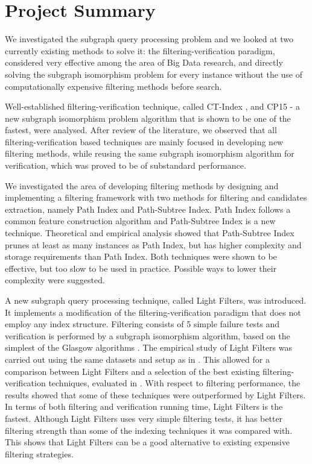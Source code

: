 \documentclass{l4proj}
\begin{document}
\section{Project Summary}
We investigated the subgraph query processing problem and we looked at two currently existing methods to solve it: the filtering-verification paradigm, considered very effective among the area of Big Data research, and directly solving the subgraph isomorphism problem for every instance without the use of computationally expensive filtering methods before search.

Well-established filtering-verification technique, called CT-Index \cite{ctindex}, and CP15 \cite{CP2015}- a new subgraph isomorphism problem algorithm that is shown to be one of the fastest, were analysed. After review of the literature, we observed that all filtering-verification based techniques are mainly focused in developing new filtering methods, while reusing the same subgraph isomorphism algorithm for verification, which was proved to be of substandard performance.

We investigated the area of developing filtering methods by designing and implementing a filtering framework with two methods for filtering and candidates extraction, namely Path Index and Path-Subtree Index. Path Index follows a common feature construction algorithm and Path-Subtree Index is a new technique. Theoretical and empirical analysis showed that Path-Subtree Index prunes at least as many instances as Path Index, but has higher complexity and storage requirements than Path Index. Both techniques were shown to be effective, but too slow to be used in practice. Possible ways to lower their complexity were suggested.

A new subgraph query processing technique, called Light Filters, was introduced. It implements a modification of the filtering-verification paradigm that does not employ any index structure. Filtering consists of 5 simple failure tests and verification is performed by a subgraph isomorphism algorithm, based on the simplest of the Glasgow algorithms \cite{CP2015}. The empirical study of Light Filters was carried out using the same datasets and setup as in \cite{foteini}. This allowed for a comparison between Light Filters and a selection of the best existing filtering-verification techniques, evaluated in \cite{foteini}. With respect to filtering performance, the results showed that some of these techniques were outperformed by Light Filters. In terms of both filtering and verification running time, Light Filters is the fastest. Although Light Filters uses very simple filtering tests, it has better filtering strength than some of the indexing techniques it was compared with. This shows that Light Filters can be a good alternative to existing expensive filtering strategies.
\end{document}
